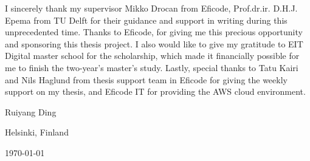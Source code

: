 I sincerely thank my supervisor Mikko Drocan from Eficode, Prof.dr.ir. D.H.J. Epema from TU Delft for their guidance and support in writing during this unprecedented time. Thanks to Eficode, for giving me this precious opportunity and sponsoring this thesis project. I also would like to give my gratitude to EIT Digital master school for the scholarship, which made it financially possible for me to finish the two-year's master's study. Lastly, special thanks to Tatu Kairi and Nils Haglund from thesis support team in Eficode for giving the weekly support on my thesis, and Eficode IT for providing the AWS cloud environment.
\vspace{1\baselineskip}


\noindent
Ruiyang Ding

\vspace{1\baselineskip}

\noindent
Helsinki, Finland

\noindent
\today
